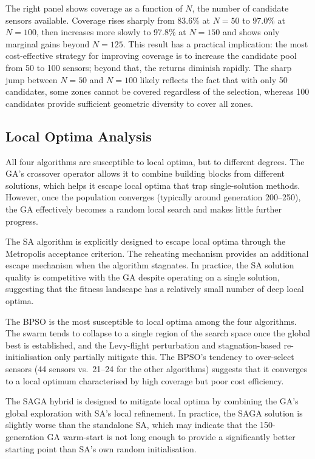 \documentclass[12pt,a4paper]{article}
\begin{document}
The right panel shows coverage as a function of $N$, the number of candidate sensors available.
Coverage rises sharply from 83.6\% at $N = 50$ to 97.0\% at $N = 100$, then increases more slowly to 97.8\% at $N = 150$ and shows only marginal gains beyond $N = 125$.
This result has a practical implication: the most cost-effective strategy for improving coverage is to increase the candidate pool from 50 to 100 sensors; beyond that, the returns diminish rapidly.
The sharp jump between $N = 50$ and $N = 100$ likely reflects the fact that with only 50 candidates, some zones cannot be covered regardless of the selection, whereas 100 candidates provide sufficient geometric diversity to cover all zones.

\subsection{Local Optima Analysis}

All four algorithms are susceptible to local optima, but to different degrees.
The GA's crossover operator allows it to combine building blocks from different solutions, which helps it escape local optima that trap single-solution methods.
However, once the population converges (typically around generation 200--250), the GA effectively becomes a random local search and makes little further progress.

The SA algorithm is explicitly designed to escape local optima through the Metropolis acceptance criterion.
The reheating mechanism provides an additional escape mechanism when the algorithm stagnates.
In practice, the SA solution quality is competitive with the GA despite operating on a single solution, suggesting that the fitness landscape has a relatively small number of deep local optima.

The BPSO is the most susceptible to local optima among the four algorithms.
The swarm tends to collapse to a single region of the search space once the global best is established, and the Levy-flight perturbation and stagnation-based re-initialisation only partially mitigate this.
The BPSO's tendency to over-select sensors (44 sensors vs.\ 21--24 for the other algorithms) suggests that it converges to a local optimum characterised by high coverage but poor cost efficiency.

The SAGA hybrid is designed to mitigate local optima by combining the GA's global exploration with SA's local refinement.
In practice, the SAGA solution is slightly worse than the standalone SA, which may indicate that the 150-generation GA warm-start is not long enough to provide a significantly better starting point than SA's own random initialisation.
\end{document}
